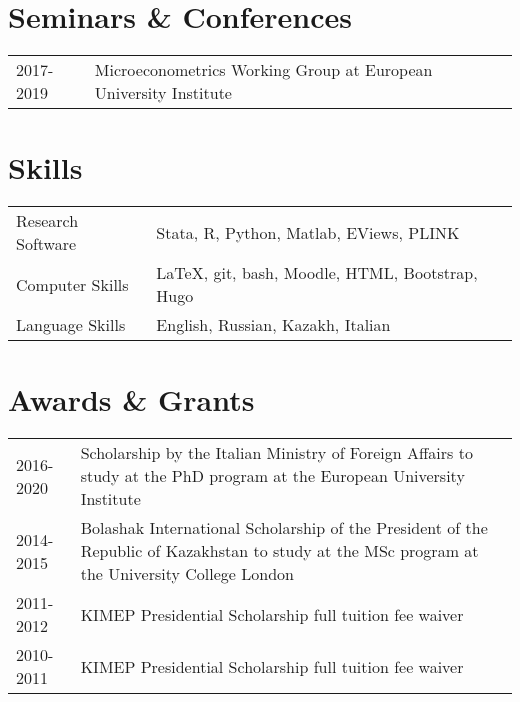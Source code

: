 \documentclass[a4, 11pt]{article}
\begin{document}
    \section*{Seminars \& Conferences}
  \begin{table}[H]
      \begin{tabular}{p{2cm}p{14cm}}
          2017-2019 & {Microeconometrics Working Group} at {European University Institute}\\
      \end{tabular}
    \end{table}


    \section*{Skills}\begin{table}[H]
    \begin{tabular}{p{2cm}p{14cm}}
        Research Software & Stata, R, Python, Matlab, EViews, PLINK \\
        Computer Skills & LaTeX, git, bash, Moodle, HTML, Bootstrap, Hugo \\
        Language Skills & English, Russian, Kazakh, Italian \\
    \end{tabular}
  \end{table}


    \section*{Awards \& Grants}
  \begin{table}[H]
      \begin{tabular}{p{2cm}p{14cm}}
          2016-2020 & {Scholarship by the Italian Ministry of Foreign Affairs}{} to study at the PhD program at the European University Institute\\
          2014-2015 & {Bolashak International Scholarship of the President of the Republic of Kazakhstan}{} to study at the MSc program at the University College London\\
          2011-2012 & {KIMEP Presidential Scholarship}{} full tuition fee waiver\\
          2010-2011 & {KIMEP Presidential Scholarship}{} full tuition fee waiver\\
      \end{tabular}
    \end{table}

    
\end{document}
